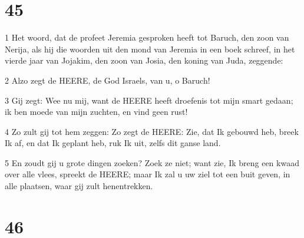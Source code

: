 \chapter{45}

\par 1 Het woord, dat de profeet Jeremia gesproken heeft tot Baruch, den zoon van Nerija, als hij die woorden uit den mond van Jeremia in een boek schreef, in het vierde jaar van Jojakim, den zoon van Josia, den koning van Juda, zeggende:
\par 2 Alzo zegt de HEERE, de God Israels, van u, o Baruch!
\par 3 Gij zegt: Wee nu mij, want de HEERE heeft droefenis tot mijn smart gedaan; ik ben moede van mijn zuchten, en vind geen rust!
\par 4 Zo zult gij tot hem zeggen: Zo zegt de HEERE: Zie, dat Ik gebouwd heb, breek Ik af, en dat Ik geplant heb, ruk Ik uit, zelfs dit ganse land.
\par 5 En zoudt gij u grote dingen zoeken? Zoek ze niet; want zie, Ik breng een kwaad over alle vlees, spreekt de HEERE; maar Ik zal u uw ziel tot een buit geven, in alle plaatsen, waar gij zult henentrekken.

\chapter{46}

